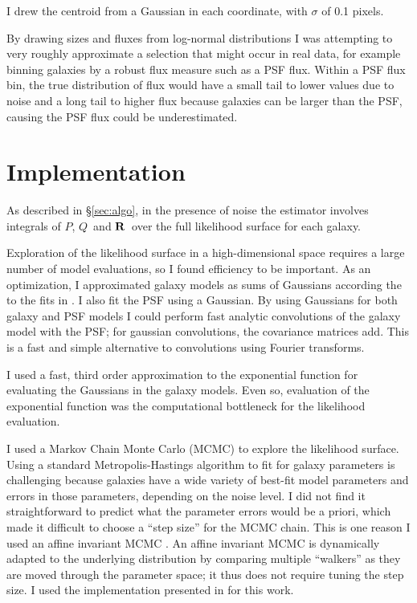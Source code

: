 \documentclass[12pt,preprint]{aastex}
\newcommand{\vecQ}{\mbox{\boldmath $Q$}}
\newcommand{\matR}{\mbox{$\bf R$}}
\begin{document}
I drew the centroid from a Gaussian in each coordinate, with $\sigma$ of 0.1
pixels.  

By drawing sizes and fluxes from log-normal distributions I was attempting to
very roughly approximate a selection that might occur in real data, for example
binning galaxies by a robust flux measure such as a PSF flux.  Within a PSF
flux bin, the true distribution of flux would have a small tail to lower values
due to noise and a long tail to higher flux because galaxies can be larger than
the PSF, causing the PSF flux could be underestimated.

\section{Implementation} \label{sec:impl}

As described in \S \ref{sec:algo}, in the presence of noise the estimator
involves integrals of $P$, \vecQ\ and \matR\ over the full likelihood surface
for each galaxy.

Exploration of the likelihood surface in a high-dimensional space requires a
large number of model evaluations, so I found efficiency to be important.  As
an optimization, I approximated galaxy models as sums of Gaussians according
the to the fits in \citet{HoggGMix}.  I also fit the PSF using a Gaussian.  By
using Gaussians for both galaxy and PSF models I could perform fast analytic
convolutions of the galaxy model with the PSF; for gaussian convolutions, the
covariance matrices add.  This is a fast and simple alternative to convolutions
using Fourier transforms.

I used a fast, third order approximation to the exponential function for
evaluating the Gaussians in the galaxy models.  Even so, evaluation of the
exponential function was the computational bottleneck for the likelihood
evaluation.

I used a Markov Chain Monte Carlo (MCMC) to explore the likelihood surface.
Using a standard Metropolis-Hastings algorithm \citep{Metropolis53}  to fit for
galaxy parameters is challenging because galaxies have a wide variety of
best-fit model parameters and errors in those parameters, depending on the
noise level.  I did not find it straightforward to predict what the parameter
errors would be a priori, which made it difficult to choose a ``step size'' for
the MCMC chain.  This is one reason I used an affine invariant MCMC
\citet{GoodmanWeare10}.  An affine invariant MCMC is dynamically adapted to the
underlying distribution by comparing multiple ``walkers'' as they are moved
through the parameter space; it thus does not require tuning the step size.  I
used the implementation presented in \citet{Mackey13} for this work.
\end{document}
